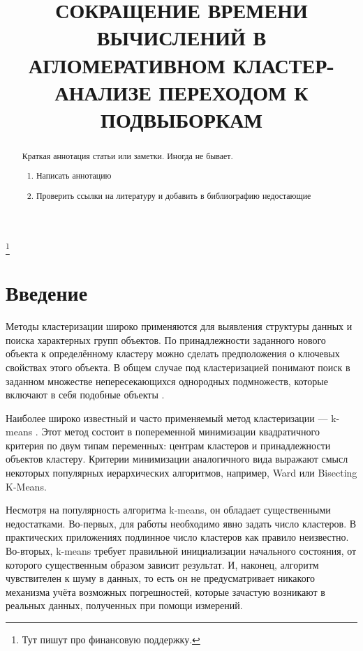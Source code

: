 \documentclass[12pt]{a&t}
\begin{document}

\title{СОКРАЩЕНИЕ ВРЕМЕНИ ВЫЧИСЛЕНИЙ В АГЛОМЕРАТИВНОМ КЛАСТЕР-АНАЛИЗЕ ПЕРЕХОДОМ К ПОДВЫБОРКАМ}
\thanks{Тут пишут про финансовую поддержку.}


\maketitle

\begin{abstract}
Краткая аннотация статьи или заметки. Иногда не бывает. 
\begin{enumerate}
	\item Написать аннотацию
	\item Проверить ссылки на литературу и добавить в библиографию недостающие
\end{enumerate}
\end{abstract}


\section{Введение}

Методы кластеризации широко применяются для выявления структуры данных и поиска характерных групп объектов. По принадлежности заданного нового объекта к определённому кластеру можно сделать предположения о ключевых свойствах этого объекта. В общем случае под кластеризацией понимают  поиск в заданном множестве  непересекающихся однородных подмножеств, которые включают в себя подобные объекты \cite{Mirkin-Vvedenie-v-analiz-dannyh}.
 
Наиболее широко известный и часто применяемый метод кластеризации --- \mbox{k-means} \cite{K-Means-canonical}. Этот метод состоит в попеременной минимизации квадратичного критерия по двум типам переменных: центрам кластеров и принадлежности объектов кластеру. Критерии минимизации аналогичного вида выражают смысл некоторых популярных иерархических алгоритмов, например, Ward \cite{Ward-canonical} или Bisecting \mbox{K-Means}\cite{Mirkin-Clustering-A-Data-Recovery-Approach}.

Несмотря на популярность алгоритма \mbox{k-means}, он обладает существенными недостатками. Во-первых, для работы необходимо явно задать число кластеров. В практических приложениях подлинное число кластеров как правило неизвестно. Во-вторых, \mbox{k-means} требует правильной инициализации начального состояния, от которого существенным образом зависит результат. И, наконец, алгоритм чувствителен к шуму в данных, то есть он не предусматривает никакого механизма учёта возможных погрешностей, которые зачастую возникают в реальных данных, полученных при помощи измерений.
\end{document}
